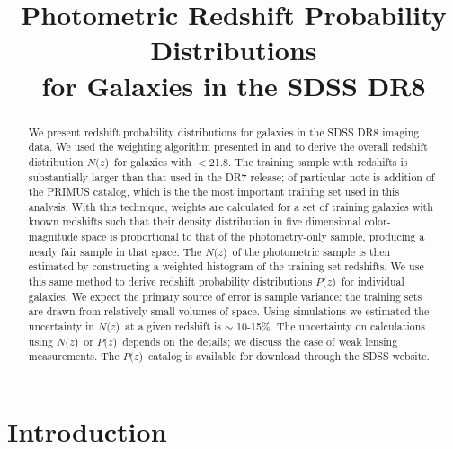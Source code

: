 \documentclass[preprint]{aastex}
\newcommand{\localbias}{10-15\%}
\newcommand{\rmax}{21.8}
\newcommand{\pofz}{$P(z$)}
\newcommand{\Nofz}{$N(z$)}
\begin{document}
\title{Photometric Redshift Probability Distributions \\for Galaxies in the SDSS DR8}



\begin{abstract}

We present redshift probability distributions for galaxies in the SDSS DR8
imaging data.  We used the weighting algorithm presented in
\citet{LimaPhotoz08} and \citet{CunhaPhotoz09} to derive the overall redshift
distribution \Nofz\ for galaxies with \rmag$ < $\rmax.  The training sample
with redshifts is substantially larger than that used in the DR7 release; of
particular note is addition of the PRIMUS catalog, which is the the most
important training set used in this analysis. With this technique, weights are
calculated for a set of training galaxies with known redshifts such that their
density distribution in five dimensional color-magnitude space is proportional
to that of the photometry-only sample, producing a nearly fair sample in that
space.  The \Nofz\ of the photometric sample is then estimated by constructing
a weighted histogram of the training set redshifts.  We use this same
method to derive redshift probability distributions \pofz\ for individual
galaxies.
We expect the primary source of error is sample variance: the training sets are
drawn from relatively small volumes of space.  Using simulations we estimated
the uncertainty in \Nofz\ at a given redshift is $\sim$ \localbias.  The
uncertainty on calculations using \Nofz\ or \pofz\ depends on the details; we
discuss the case of weak lensing measurements.  The \pofz\ catalog is available
for download through the SDSS website.  


\end{abstract}

\section{Introduction} \label{sec:intro}
\end{document}
